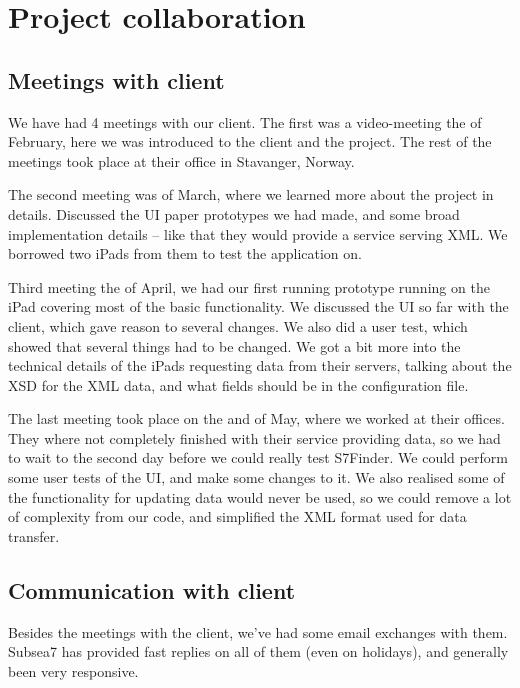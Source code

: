 \section{Project collaboration}

\subsection{Meetings with client}

We have had 4 meetings with our client. The first was a video-meeting
the  of February, here we was introduced to the client and the
project. The rest of the meetings took place at their office in
Stavanger, Norway.

The second meeting was  of March, where we learned more about
the project in details. Discussed the UI paper prototypes we had made,
and some broad implementation details -- like that they would provide
a service serving XML. We borrowed two iPads from them to test the
application on.

Third meeting the  of April, we had our first running prototype
running on the iPad covering most of the basic functionality. We
discussed the UI so far with the client, which gave reason to several
changes. We also did a user test, which showed that several things had
to be changed. We got a bit more into the technical details of the
iPads requesting data from their servers, talking about the XSD for
the XML data, and what fields should be in the configuration file.

The last meeting took place on the  and  of May, where
we worked at their offices. They where not completely finished with
their service providing data, so we had to wait to the second day
before we could really test S7Finder. We could perform some user tests
of the UI, and make some changes to it. We also realised some of the
functionality for updating data would never be used, so we could
remove a lot of complexity from our code, and simplified the XML
format used for data transfer.

\subsection{Communication with client}

Besides the meetings with the client, we've had some email exchanges
with them. Subsea7 has provided fast replies on all of them (even on
holidays), and generally been very responsive.

